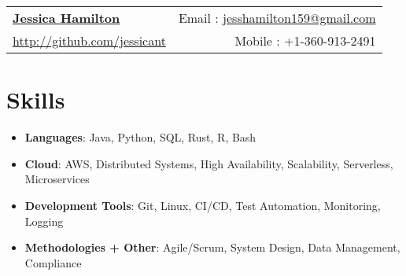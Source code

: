 \documentclass[letterpaper,11pt]{article}
\newcommand{\resumeItem}[2]{
  \item\small{
    \textbf{#1}{: #2 \vspace{-2pt}}
  }
}
\newcommand{\resumeSubHeadingListStart}{\begin{itemize}[leftmargin=*]}
\newcommand{\resumeSubHeadingListEnd}{\end{itemize}}
\newcommand{\resumeItemListStart}{\begin{itemize}}
\newcommand{\resumeItemListEnd}{\end{itemize}\vspace{-5pt}}
\begin{document}
\begin{tabular*}{\textwidth}{l@{\extracolsep{\fill}}r}
  \textbf{\href{https://github.com/jessicant}{\Large Jessica Hamilton}} & Email : \href{mailto:jesshamilton159@gmail.com}{jesshamilton159@gmail.com}\\
  \href{http://github.com/jessicant}{http://github.com/jessicant} & Mobile : +1-360-913-2491 \\
\end{tabular*}

\section{Skills}
 \resumeSubHeadingListStart
      \resumeItemListStart
        \resumeItem{Languages}
          {Java, Python, SQL, Rust, R, Bash}
        \resumeItem{Cloud}
          {AWS, Distributed Systems, High Availability, Scalability, Serverless, Microservices}
        \resumeItem{Development Tools}
          {Git, Linux, CI/CD, Test Automation, Monitoring, Logging}
        \resumeItem{Methodologies + Other}
          {Agile/Scrum, System Design, Data Management, Compliance}
      \resumeItemListEnd
 \resumeSubHeadingListEnd

\end{document}
